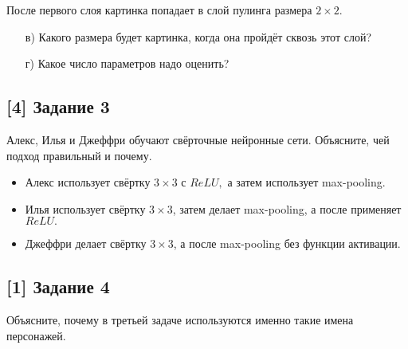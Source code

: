 \documentclass[12pt, a4paper, oneside]{article}
\begin{document}
После первого слоя картинка попадает в слой пулинга размера $2 \times 2$. 
\begin{enumerate} 
    \item[в)]  Какого размера будет картинка, когда она пройдёт сквозь этот слой?  
    
    \item[г)] Какое число параметров надо оценить?
\end{enumerate}

\vspace{-0.5cm}
\subsection*{[4] Задание 3}
\vspace{-0.5cm}

Алекс, Илья и Джеффри обучают свёрточные нейронные сети. Объясните, чей подход правильный и почему.

\begin{itemize} 
\item Алекс использует свёртку $3 \times 3$ с $ReLU,$ а затем использует max-pooling. 
\item Илья использует свёртку $3 \times 3$, затем делает max-pooling, а после применяет $ReLU.$
\item Джеффри делает свёртку $3 \times 3$, а после max-pooling без функции активации. 
\end{itemize} 

\vspace{-0.5cm}
\subsection*{[1] Задание 4}
\vspace{-0.5cm}

Объясните, почему в третьей задаче используются именно такие имена персонажей.
\end{document}
